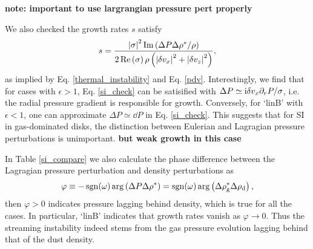 {\bf note: important to use largrangian pressure pert properly}

We also checked the growth rates $s$ satisfy 
\begin{align} 
  s = \frac{\left|\sigma\right|^2\operatorname{Im}\left(\Delta P
    \Delta\rho^*/\rho\right)}{2\operatorname{Re}\left(\sigma\right)\rho\left(\left|\delta
  v_x\right|^2+\left|\delta
  v_z\right|^2\right)}, \label{si_check}
\end{align}
as implied by Eq. \ref{thermal_instability} and
Eq. \ref{pdv}. %
Interestingly, we find that for cases with
$\epsilon>1$, Eq. \ref{si_check} can be satisified with $\Delta
P\simeq \mathrm{i}\delta v_x \partial_rP/\sigma$, i.e. the radial pressure gradient
is responsible for growth. Conversely, for `linB' with $\epsilon
< 1$, one can approximate $\Delta P \simeq \dd P$ in Eq. \ref{si_check}. This
suggests that for SI in gas-dominated disks, the distinction between
Eulerian and Lagragian pressure perturbations is unimportant. 
{\bf but weak growth in this case}

In Table \ref{si_compare} we also calculate the phase difference
between the Lagragian pressure perturbation and density perturbations
as    
\begin{align*} 
\varphi \equiv -\operatorname{sgn}(\omega)\arg\left(\Delta P\Delta\rho^*\right)
        = \operatorname{sgn}(\omega)\arg\left(\Delta\rho_\mathrm{g}^*\Delta\rho_\mathrm{d}\right),\notag
\end{align*}
then $\varphi > 0 $ indicates pressure lagging behind density, which
is true for all the cases. In particular, `linB' indicates that growth
rates vanish as $\varphi \to 0$.  
Thus the streaming instability indeed stems  
from the gas pressure evolution lagging behind that of the dust 
density. 




